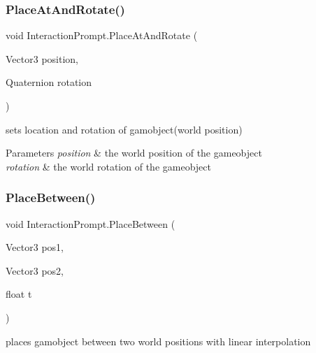 \subsubsection{\texorpdfstring{Place\+At\+And\+Rotate()}{PlaceAtAndRotate()}}
{\footnotesize\ttfamily void Interaction\+Prompt.\+Place\+At\+And\+Rotate (\begin{DoxyParamCaption}\item[{Vector3}]{position,  }\item[{Quaternion}]{rotation }\end{DoxyParamCaption})}



sets location and rotation of gamobject(world position) 


\begin{DoxyParams}{Parameters}
{\em position} & the world position of the gameobject\\
\hline
{\em rotation} & the world rotation of the gameobject\\
\hline
\end{DoxyParams}
\mbox{\label{class_interaction_prompt_a85caeb27db4542f995d8704966beefc1}} 
\subsubsection{\texorpdfstring{Place\+Between()}{PlaceBetween()}}
{\footnotesize\ttfamily void Interaction\+Prompt.\+Place\+Between (\begin{DoxyParamCaption}\item[{Vector3}]{pos1,  }\item[{Vector3}]{pos2,  }\item[{float}]{t }\end{DoxyParamCaption})}



places gamobject between two world positions with linear interpolation 


